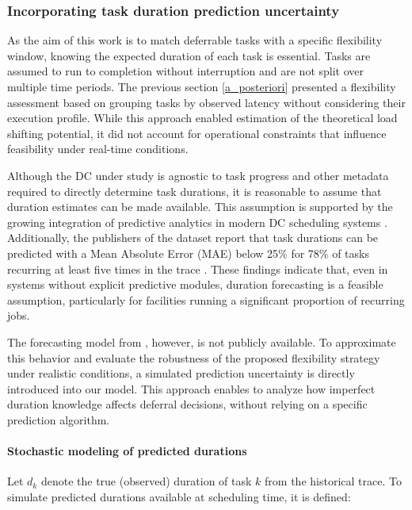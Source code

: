 \documentclass[preprint,12pt]{elsarticle}
\begin{document}
\subsubsection{Incorporating task duration prediction uncertainty} \label{prediction_uncertainty_methods}
As the aim of this work is to match deferrable tasks with a specific flexibility window, knowing the expected duration of each task is essential. Tasks are assumed to run to completion without interruption and are not split over multiple time periods. 
The previous section \ref{a_posteriori} presented a flexibility assessment based on grouping tasks by observed latency without considering their execution profile. While this approach enabled estimation of the theoretical load shifting potential, it did not account for operational constraints that influence feasibility under real-time conditions.

Although the DC under study is agnostic to task progress and other metadata required to directly determine task durations, it is reasonable to assume that duration estimates can be made available. This assumption is supported by the growing integration of predictive analytics in modern DC scheduling systems \cite{Hu2021, Yeung2022, Amaris2016, Kawaguchi2024}. Additionally, the publishers of the dataset report that task durations can be predicted with a %
Mean Absolute Error (MAE) below 25\% for 78\% of tasks recurring at least five times in the trace \cite{Weng2022}. These findings indicate that, even in systems without explicit predictive modules, duration forecasting is a feasible assumption, particularly for facilities running a significant proportion of recurring jobs.

The forecasting model from \cite{Weng2022}, however, is not publicly available. To approximate this behavior and evaluate the robustness of the proposed flexibility strategy under realistic conditions, a simulated prediction uncertainty is directly introduced into our model. This approach enables to analyze how imperfect duration knowledge affects deferral decisions, without relying on a specific prediction algorithm.

\paragraph{Stochastic modeling of predicted durations}

Let $d_k$ denote the true (observed) duration of task $k$ from the historical trace. To simulate predicted durations available at scheduling time, it is defined:
\end{document}
